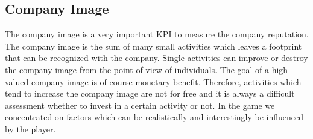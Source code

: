 \subsection{Company Image} \label{company_image}


The company image is a very important KPI to measure the company reputation. The company image is the sum of many small activities which leaves a footprint that can be recognized with the company. Single activities can improve or destroy the company image from the point of view of individuals. The goal of a high valued company image is of course monetary benefit. Therefore, activities which tend to increase the company image are not for free and it is always a difficult assessment whether to invest in a certain activity or not. In the game we concentrated on factors which can be realistically and interestingly be influenced by the player.

